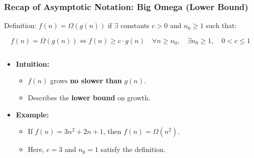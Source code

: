 \documentclass[10pt,aspectratio=43]{beamer}
\begin{document}
\begin{frame}
  \frametitle{Recap of Asymptotic Notation: Big Omega (Lower Bound)}

  \begin{block}{Definition:}
          \( f(n) = \Omega(g(n)) \) if $\exists$ constants $c > 0$ and $n_0 \geq 1$ such that:
          
\[
f(n) = \Omega(g(n)) \iff f(n) \geq c \cdot g(n) \quad \forall n \geq n_0,
 \quad \exists n_0 \geq 1, \quad 0 < c \leq 1
\]
\end{block}
  \begin{columns}
    \begin{column}{0.7\textwidth}
          \begin{itemize}
        \item \textbf{Intuition:}
        \begin{itemize}
            \item \( f(n) \) grows \textbf{no slower than} \( g(n) \).
            \vspace{3pt}
            \item Describes the \textbf{lower bound} on growth.
        \end{itemize}
        \item \textbf{Example:}
        \begin{itemize}
            \item If \( f(n) = 3n^2 + 2n + 1 \), then \( f(n) = \Omega(n^2) \).
            \vspace{3pt}
            \item Here, \( c = 3 \) and \( n_0 = 1 \) satisfy the definition.
        \end{itemize}
      \end{itemize}
    \end{column}


\end{columns}
\end{frame}
\end{document}
